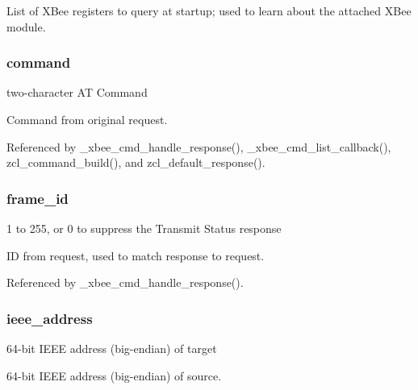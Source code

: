 List of X\-Bee registers to query at startup; used to learn about the attached X\-Bee module. \hypertarget{group__xbee__atcmd_ga1a5aaa930940857f68f245eeb89506b5}{
\subsubsection[{command}]{ command}}\label{group__xbee__atcmd_ga1a5aaa930940857f68f245eeb89506b5}


two-\/character A\-T Command 

Command from original request. 

Referenced by \-\_\-xbee\-\_\-cmd\-\_\-handle\-\_\-response(), \-\_\-xbee\-\_\-cmd\-\_\-list\-\_\-callback(), zcl\-\_\-command\-\_\-build(), and zcl\-\_\-default\-\_\-response().

\hypertarget{group__xbee__atcmd_ga03c1016ac46b9df250b994f242cf956a}{
\subsubsection[{frame\-\_\-id}]{ frame\-\_\-id}}\label{group__xbee__atcmd_ga03c1016ac46b9df250b994f242cf956a}


1 to 255, or 0 to suppress the Transmit Status response 

I\-D from request, used to match response to request. 

Referenced by \-\_\-xbee\-\_\-cmd\-\_\-handle\-\_\-response().

\hypertarget{group__xbee__atcmd_ga2549f921e25a72dfa05a2154a792e2bf}{
\subsubsection[{ieee\-\_\-address}]{ ieee\-\_\-address}}\label{group__xbee__atcmd_ga2549f921e25a72dfa05a2154a792e2bf}


64-\/bit I\-E\-E\-E address (big-\/endian) of target 

64-\/bit I\-E\-E\-E address (big-\/endian) of source.

